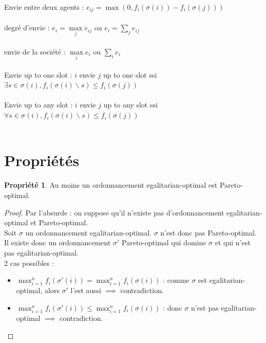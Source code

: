 \documentclass[12pt]{article}
\theoremstyle{definition}
\newtheorem{prop}{Propriété}
\begin{document}
Envie entre deux agents : $e_{ij} = \max(0, f_i(\sigma(i)) - f_i(\sigma(j)))$\\\\
degré d'envie : $e_i = \max\limits_j e_{ij}$ ou $e_i = \sum\limits_j e_{ij}$\\\\
envie de la société : $\max\limits_i e_i$ ou $\sum\limits_i e_i$\\\\
Envie up to one slot : $i$ envie $j$ up to one slot ssi $\exists s\in \sigma(i), f_i(\sigma(i)\backslash s)\leq f_i(\sigma(j))$\\\\
Envie up to any slot : $i$ envie $j$ up to any slot ssi $\forall s\in \sigma(i), f_i(\sigma(i)\backslash s)\leq f_i(\sigma(j))$\\\\


\section{Propriétés}
\begin{prop}
    Au moins un ordonnancement egalitarian-optimal est Pareto-optimal.
\end{prop}

\begin{proof}
    Par l'absurde : on suppose qu'il n'existe pas d'ordonnancement egalitarian-optimal et Pareto-optimal.\\
    Soit $\sigma$ un ordonnancement egalitarian-optimal. $\sigma$ n'est donc pas Pareto-optimal. Il existe donc un ordonnancement $\sigma'$ Pareto-optimal qui domine $\sigma$ et qui n'est pas egalitarian-optimal.\\
    2 cas possibles : 
    \begin{itemize}
        \item $\max_{i = 1}^n f_i(\sigma'(i)) = \max_{i = 1}^n f_i(\sigma(i))$ : comme $\sigma$ est egalitarian-optimal, alors $\sigma'$ l'est aussi $\implies$ contradiction.
        \item $\max_{i = 1}^n f_i(\sigma'(i)) \leq \max_{i = 1}^n f_i(\sigma(i))$ : donc $\sigma$ n'est pas egalitarian-optimal $\implies$ contradiction.
    \end{itemize}
\end{proof}
\end{document}
